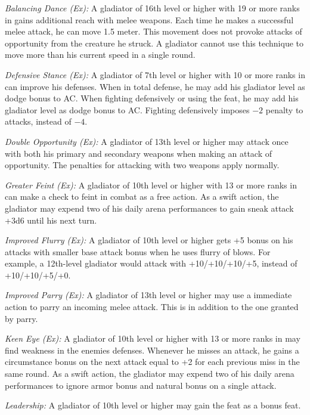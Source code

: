 \textit{Balancing Dance (Ex):} A gladiator of 16th level or higher with 19 or more ranks in  gains additional reach with melee weapons. Each time he makes a successful melee attack, he can move 1.5 meter. This movement does not provoke attacks of opportunity from the creature he struck. A gladiator cannot use this technique to move more than his current speed in a single round.

\textit{Defensive Stance (Ex):} A gladiator of 7th level or higher with 10 or more ranks in  can improve his defenses. When in total defense, he may add \onehalf his gladiator level as dodge bonus to AC. When fighting defensively or using the  feat, he may add \onequarter his gladiator level as dodge bonus to AC. Fighting defensively imposes $-2$ penalty to attacks, instead of $-4$.

\textit{Double Opportunity (Ex):} A gladiator of 13th level or higher may attack once with both his primary and secondary weapons when making an attack of opportunity. The penalties for attacking with two weapons apply normally.

\textit{Greater Feint (Ex):} A gladiator of 10th level or higher with 13 or more ranks in  can make a  check to feint in combat as a free action. As a swift action, the gladiator may expend two of his daily arena performances to gain sneak attack +3d6 until his next turn.

\textit{Improved Flurry (Ex):} A gladiator of 10th level or higher gets +5 bonus on his attacks with smaller base attack bonus when he uses flurry of blows. For example, a 12th-level gladiator would attack with +10/+10/+10/+5, instead of +10/+10/+5/+0.

\textit{Improved Parry (Ex):} A gladiator of 13th level or higher may use a immediate action to parry an incoming melee attack. This is in addition to the one granted by parry.

\textit{Keen Eye (Ex):} A gladiator of 10th level or higher with 13 or more ranks in  may find weakness in the enemies defenses. Whenever he misses an attack, he gains a circumstance bonus on the next attack equal to +2 for each previous miss in the same round. As a swift action, the gladiator may expend two of his daily arena performances to ignore armor bonus and natural bonus on a single attack. 

\textit{Leadership:} A gladiator of 10th level or higher may gain the  feat as a bonus feat.

